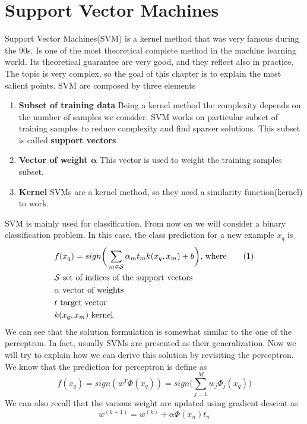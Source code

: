 \documentclass[main.tex]{subfiles}
\newcommand\numberthis{\addtocounter{equation}{1}\tag{\theequation}}
\begin{document}
\section{Support Vector Machines}
Support Vector Machines(SVM) is a kernel method that was very famous during the 90s. Is one of the most theoretical complete method in the machine learning world. Its theoretical guarantee are very good, and they reflect also in practice. The topic is very complex, so the goal of this chapter is to explain the most salient points.
SVM are composed by three elements
\begin{enumerate}
    \item \textbf{Subset of training data} Being a kernel method the complexity depends on the number of samples we consider. SVM works on particular subset of training samples to reduce complexity and find sparser solutions. This subset is called \textbf{support vectors}
    \item \textbf{Vector of weight $\boldsymbol{\alpha}$} This vector is used to weight the training samples subset.
    \item \textbf{Kernel} SVMs are a kernel method, so they need a similarity function(kernel) to work.
\end{enumerate}
SVM is mainly used for classification. From now on we will consider a binary classification problem. In this case, the class prediction for a new example $x_q$ is
\begin{align*}
    &f(x_q) = sign\bigg( \sum_{m \in \mathcal{S}} \alpha_m t_m k(x_q,x_m) + b \bigg) \text{, where} \numberthis \\
    &\mathcal{S} \text{ set of indices of the support vectors} \\
    &\alpha \text{ vector of weights} \\
    &t \text{ target vector} \\
    &k(x_q,x_m) \text{ kernel}
\end{align*}
We can see that the solution formulation is somewhat similar to the one of the perceptron. In fact, usually SVMs are presented as their generalization. Now we will try to explain how we can derive this solution by revisiting the perceptron.
We know that the prediction for perceptron is define as
\begin{equation*}
    f(x_q) = sign(w^T \Phi(x_q)) = sign \bigg(\sum_{j=1}^M w_j \Phi_j(x_q) \bigg)
\end{equation*}
We can also recall that the various weight are updated using gradient descent as
\begin{equation*}
    w^{(k+1)} = w^{(k)} + \alpha \Phi(x_n)t_n
\end{equation*}
\end{document}
